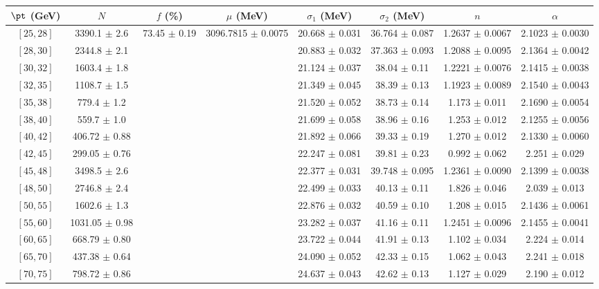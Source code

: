 \begin{tabular}{c||c|c|c|c|c|c|c}
$\pt$ (GeV) & $N$ & $f$ (\%) & $\mu$ (MeV) & $\sigma_1$ (MeV) & $\sigma_2$ (MeV) & $n$ & $\alpha$ \\
\hline
$[25, 28]$ & 3390.1 $\pm$ 2.6 & \multirow{19}{*}{73.45 $\pm$ 0.19} & \multirow{19}{*}{3096.7815 $\pm$ 0.0075} & 20.668 $\pm$ 0.031 & 36.764 $\pm$ 0.087 & 1.2637 $\pm$ 0.0067 & 2.1023 $\pm$ 0.0030\\
$[28, 30]$ & 2344.8 $\pm$ 2.1 &  &  & 20.883 $\pm$ 0.032 & 37.363 $\pm$ 0.093 & 1.2088 $\pm$ 0.0095 & 2.1364 $\pm$ 0.0042\\
$[30, 32]$ & 1603.4 $\pm$ 1.8 &  &  & 21.124 $\pm$ 0.037 & 38.04 $\pm$ 0.11 & 1.2221 $\pm$ 0.0076 & 2.1415 $\pm$ 0.0038\\
$[32, 35]$ & 1108.7 $\pm$ 1.5 &  &  & 21.349 $\pm$ 0.045 & 38.39 $\pm$ 0.13 & 1.1923 $\pm$ 0.0089 & 2.1540 $\pm$ 0.0043\\
$[35, 38]$ & 779.4 $\pm$ 1.2 &  &  & 21.520 $\pm$ 0.052 & 38.73 $\pm$ 0.14 & 1.173 $\pm$ 0.011 & 2.1690 $\pm$ 0.0054\\
$[38, 40]$ & 559.7 $\pm$ 1.0 &  &  & 21.699 $\pm$ 0.058 & 38.96 $\pm$ 0.16 & 1.253 $\pm$ 0.012 & 2.1255 $\pm$ 0.0056\\
$[40, 42]$ & 406.72 $\pm$ 0.88 &  &  & 21.892 $\pm$ 0.066 & 39.33 $\pm$ 0.19 & 1.270 $\pm$ 0.012 & 2.1330 $\pm$ 0.0060\\
$[42, 45]$ & 299.05 $\pm$ 0.76 &  &  & 22.247 $\pm$ 0.081 & 39.81 $\pm$ 0.23 & 0.992 $\pm$ 0.062 & 2.251 $\pm$ 0.029\\
$[45, 48]$ & 3498.5 $\pm$ 2.6 &  &  & 22.377 $\pm$ 0.031 & 39.748 $\pm$ 0.095 & 1.2361 $\pm$ 0.0090 & 2.1399 $\pm$ 0.0038\\
$[48, 50]$ & 2746.8 $\pm$ 2.4 &  &  & 22.499 $\pm$ 0.033 & 40.13 $\pm$ 0.11 & 1.826 $\pm$ 0.046 & 2.039 $\pm$ 0.013\\
$[50, 55]$ & 1602.6 $\pm$ 1.3 &  &  & 22.876 $\pm$ 0.032 & 40.59 $\pm$ 0.10 & 1.208 $\pm$ 0.015 & 2.1436 $\pm$ 0.0061\\
$[55, 60]$ & 1031.05 $\pm$ 0.98 &  &  & 23.282 $\pm$ 0.037 & 41.16 $\pm$ 0.11 & 1.2451 $\pm$ 0.0096 & 2.1455 $\pm$ 0.0041\\
$[60, 65]$ & 668.79 $\pm$ 0.80 &  &  & 23.722 $\pm$ 0.044 & 41.91 $\pm$ 0.13 & 1.102 $\pm$ 0.034 & 2.224 $\pm$ 0.014\\
$[65, 70]$ & 437.38 $\pm$ 0.64 &  &  & 24.090 $\pm$ 0.052 & 42.33 $\pm$ 0.15 & 1.062 $\pm$ 0.043 & 2.241 $\pm$ 0.018\\
$[70, 75]$ & 798.72 $\pm$ 0.86 &  &  & 24.637 $\pm$ 0.043 & 42.62 $\pm$ 0.13 & 1.127 $\pm$ 0.029 & 2.190 $\pm$ 0.012\\

\end{tabular}

